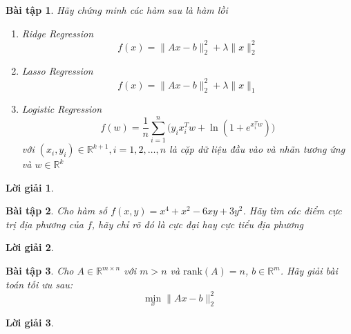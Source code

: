 \documentclass[14pt, a4paper]{article}
\theoremstyle{sltheorem}
\newtheorem{baitap}{Bài tập}
\newtheorem*{loigiai}{Lời giải}
\begin{document}
    \begin{baitap}
        Hãy chứng minh các hàm sau là hàm lồi

        \begin{enumerate}[wide, labelwidth=!, labelindent=0pt,label=\textbf{\arabic*}.]
            \item Ridge Regression
            \begin{equation*}
                f(x)=\lVert Ax - b \rVert_2^2 + \lambda \lVert x \rVert_2^2
            \end{equation*}
            \item Lasso Regression
            \begin{equation*}
                f(x)=\lVert Ax - b \rVert_2^2 + \lambda \lVert x \rVert_1
            \end{equation*}
            \item Logistic Regression
            \begin{equation*}
                f(w)=\dfrac{1}{n}\sum_{i=1}^n \Big( y_i x_i^T w + \ln(1 + e^{x_i^T w}) \Big)
            \end{equation*}
            với $(x_i, y_i) \in \mathbb{R}^{k+1},i=1,2,\dots,n$ là cặp dữ liệu đầu vào và nhãn tương ứng và $w \in \mathbb{R}^k$
        \end{enumerate}
    \end{baitap}

    \begin{loigiai}
        
    \end{loigiai}

    \begin{baitap}
        Cho hàm số $f(x, y) = x^4 + x^2 - 6xy + 3y^2$. Hãy tìm các điểm cực trị địa phương của $f$, hãy chỉ rõ đó là cực đại hay cực tiểu địa phương
    \end{baitap}

    \begin{loigiai}
    \end{loigiai}

    \begin{baitap}
        Cho $A \in \mathbb{R}^{m \times n}$ với $m > n$ và $\mathrm{rank}(A)=n$, $b \in \mathbb{R}^{m}$. Hãy giải bài toán tối ưu sau:
        \begin{equation*}
            \min_x \lVert Ax - b \rVert_2^2
        \end{equation*}
    \end{baitap}

    \begin{loigiai}
    \end{loigiai}
\end{document}
